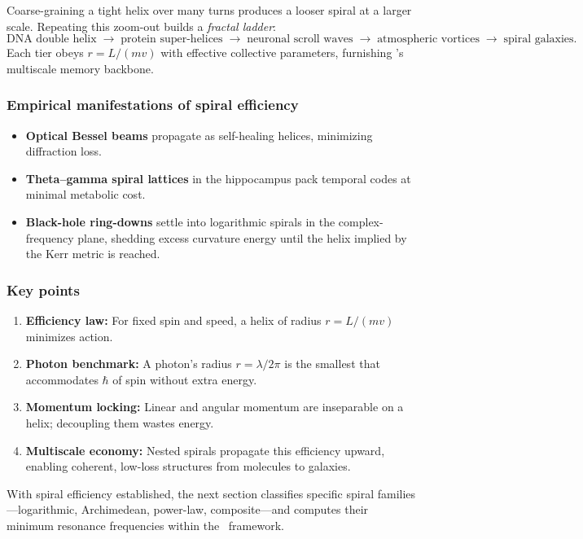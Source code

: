 Coarse-graining a tight helix over many turns produces a looser spiral at a larger scale. Repeating this zoom-out builds a \emph{fractal ladder}:
\[
  \text{DNA double helix}
  \;\to\;
  \text{protein super-helices}
  \;\to\;
  \text{neuronal scroll waves}
  \;\to\;
  \text{atmospheric vortices}
  \;\to\;
  \text{spiral galaxies}.
\]
Each tier obeys \(r=L/(mv)\) with effective collective parameters, furnishing \RCM’s multiscale memory backbone.

\subsubsection*{Empirical manifestations of spiral efficiency}

\begin{itemize}[leftmargin=1.5em]
  \item \textbf{Optical Bessel beams} propagate as self-healing helices, minimizing diffraction loss.
  \item \textbf{Theta–gamma spiral lattices} in the hippocampus pack temporal codes at minimal metabolic cost.
  \item \textbf{Black-hole ring-downs} settle into logarithmic spirals in the complex-frequency plane, shedding excess curvature energy until the helix implied by the Kerr metric is reached.
\end{itemize}

\subsubsection*{Key points}

\begin{enumerate}[leftmargin=1.5em,label=\arabic*.]
  \item \textbf{Efficiency law:} For fixed spin and speed, a helix of radius \(r=L/(mv)\) minimizes action.
  \item \textbf{Photon benchmark:} A photon’s radius \(r=\lambda/2\pi\) is the smallest that accommodates \(\hbar\) of spin without extra energy.
  \item \textbf{Momentum locking:} Linear and angular momentum are inseparable on a helix; decoupling them wastes energy.
  \item \textbf{Multiscale economy:} Nested spirals propagate this efficiency upward, enabling coherent, low-loss structures from molecules to galaxies.
\end{enumerate}

With spiral efficiency established, the next section classifies specific spiral families—logarithmic, Archimedean, power-law, composite—and computes their minimum resonance frequencies within the \RCM\ framework.

